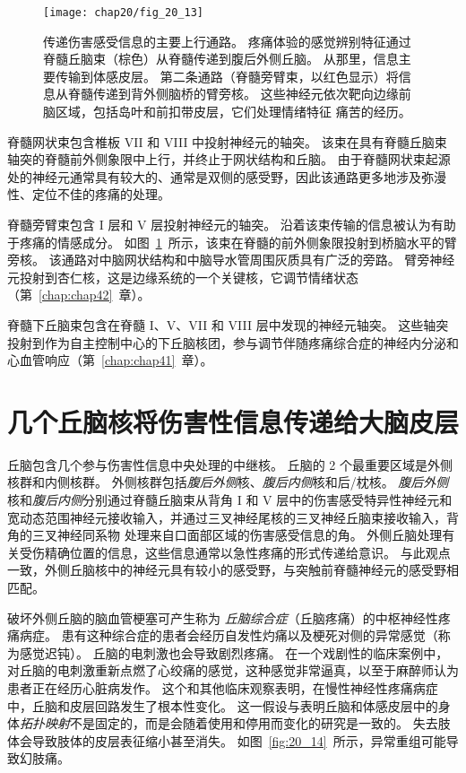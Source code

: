 \begin{figure}[htbp]
	\centering
	\texttt{[image: chap20/fig\_20\_13]}
	\caption{传递伤害感受信息的主要上行通路。
		疼痛体验的感觉辨别特征通过脊髓丘脑束（棕色）从脊髓传递到腹后外侧丘脑。
		从那里，信息主要传输到体感皮层。
		第二条通路（脊髓旁臂束，以红色显示）将信息从脊髓传递到背外侧脑桥的臂旁核。
		这些神经元依次靶向边缘前脑区域，包括岛叶和前扣带皮层，它们处理情绪特征 痛苦的经历。}
	\label{fig:20_13}
\end{figure}


脊髓网状束包含椎板 VII 和 VIII 中投射神经元的轴突。
该束在具有脊髓丘脑束轴突的脊髓前外侧象限中上行，并终止于网状结构和丘脑。
由于脊髓网状束起源处的神经元通常具有较大的、通常是双侧的感受野，因此该通路更多地涉及弥漫性、定位不佳的疼痛的处理。


脊髓旁臂束包含 I 层和 V 层投射神经元的轴突。
沿着该束传输的信息被认为有助于疼痛的情感成分。
如图~\ref{fig:20_13}~所示，该束在脊髓的前外侧象限投射到桥脑水平的臂旁核。
该通路对中脑网状结构和中脑导水管周围灰质具有广泛的旁路。
臂旁神经元投射到杏仁核，这是边缘系统的一个关键核，它调节情绪状态（第~\ref{chap:chap42}~章）。


脊髓下丘脑束包含在脊髓 I、V、VII 和 VIII 层中发现的神经元轴突。
这些轴突投射到作为自主控制中心的下丘脑核团，参与调节伴随疼痛综合症的神经内分泌和心血管响应（第~\ref{chap:chap41}~章）。



\section{几个丘脑核将伤害性信息传递给大脑皮层}

丘脑包含几个参与伤害性信息中央处理的中继核。
丘脑的 2 个最重要区域是外侧核群和内侧核群。
外侧核群包括\textit{腹后外侧}核、\textit{腹后内侧}核和后/枕核。
\textit{腹后外侧}核和\textit{腹后内侧}分别通过脊髓丘脑束从背角 I 和 V 层中的伤害感受特异性神经元和宽动态范围神经元接收输入，并通过三叉神经尾核的三叉神经丘脑束接收输入，背角的三叉神经同系物 处理来自口面部区域的伤害感受信息的角。
外侧丘脑处理有关受伤精确位置的信息，这些信息通常以急性疼痛的形式传递给意识。
与此观点一致，外侧丘脑核中的神经元具有较小的感受野，与突触前脊髓神经元的感受野相匹配。


破坏外侧丘脑的脑血管梗塞可产生称为 \textit{丘脑综合症}（丘脑疼痛）的中枢神经性疼痛病症。
患有这种综合症的患者会经历自发性灼痛以及梗死对侧的异常感觉（称为感觉迟钝）。
丘脑的电刺激也会导致剧烈疼痛。
在一个戏剧性的临床案例中，对丘脑的电刺激重新点燃了心绞痛的感觉，这种感觉非常逼真，以至于麻醉师认为患者正在经历心脏病发作。
这个和其他临床观察表明，在慢性神经性疼痛病症中，丘脑和皮层回路发生了根本性变化。
这一假设与表明丘脑和体感皮层中的身体\textit{拓扑映射}不是固定的，而是会随着使用和停用而变化的研究是一致的。
失去肢体会导致肢体的皮层表征缩小甚至消失。
如图~\ref{fig:20_14}~所示，异常重组可能导致幻肢痛。


